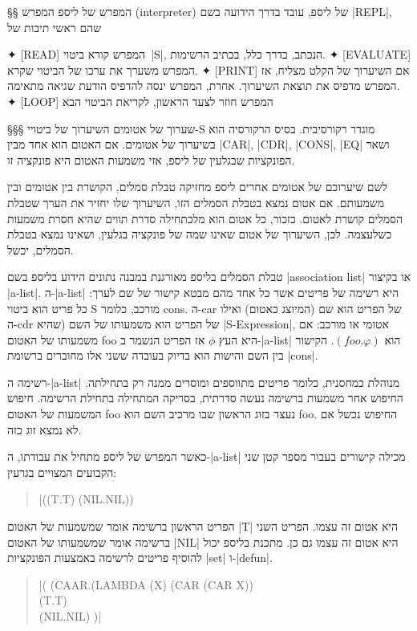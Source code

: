 §§ המפרש של ליספ
המפרש (interpreter) של ליספ, עובד בדרך הידועה בשם \E|REPL|, שהם ראשי תיבות של
\begin{description}
  ✦ [READ] המפרש קורא ביטוי~\E|S|, הנכתב, בדרך כלל, בכתיב הרשימות.
  ✦ [EVALUATE] המפרש משערך את ערכו של הביטוי שקרא.
  ✦ [PRINT] אם השיערוך של הקלט מצליח, אז המפרש מדפיס את תוצאת השיערוך. אחרת, 
המפרש ינסה להדפיס הודעת שגיאה מתאימה.
  ✦ [LOOP] המפרש חוזר לצעד הראשון, לקריאת הביטוי הבא
\end{description}

§§§ שערוך של אטומים 
השיערוך של ביטויי-S מוגדר רקורסיבית.  בסיס הרקורסיה הוא בשיערוך של אטומים. אם 
האטום הוא אחד מבין
\A|CAR|, \A|CDR|, \A|CONS|, \A|EQ| ושאר
הפונקציות שבגלעין של ליספ, אזי משמעות האטום
היא פונקציה זו. 

לשם שיערוכם של אטומים אחרים ליספ מחזיקה טבלת סמלים, הקושרת בין אטומים ובין
משמעותם.  אם אטום נמצא בטבלת הסמלים הזו, השיערוך שלו יחזיר את הערך שטבלת הסמלים
קושרת לאטום.  כזכור, כל אטום הוא מלכתחילה סדרת תווים שהיא חסרת משמעות כשלעצמה.
לכן, השיערוך של אטום שאינו שמה של פונקציה בגלעין, ושאינו נמצא בטבלת הסמלים,
יכשל.

טבלת הסמלים בליספ מאורגנת במבנה נתונים הידוע בליספ בשם \E|association list| או
בקיצור \E|a-list|.  ה-\E|a-list| היא רשימה של פריטים אשר כל אחד מהם מבטא קישור
של שם לערך: כל פריט הוא ביטוי S מורכב, כלומר cons. ה-car של הפריט הוא שם
(המיוצג כאטום) ואילו ה-cdr של הפריט הוא משמעותו של השם (שהיא \E|S-Expression|,
אטומי או מורכב: אם משמעותו של האטום foo היא העץ $ϕ$ אז הפריט הנשמר ב-\E|a-list|
הוא $(foo.φ)$.  הקישור בין השם והישות הוא בדיוק בעובדה ששני אלו מחוברים ברשומת
\E|cons|.

רשימה ה-\E|a-list| מנוהלת כמחסנית, כלומר פריטים מתווספים ומוסרים ממנה  רק
בתחילתה. החיפוש אחר משמעות ברשימה נעשה סדרתית, בסריקה המתחילה בתחילת הרשימה.
חיפוש המשמעות של האטום foo נעצר
בזוג הראשון שבו מרכיב השם הוא foo. החיפוש נכשל אם לא נמצא זוג כזה.  

כאשר המפרש של ליספ מתחיל את עבודתו, ה-\E|a-list| מכילה קישורים בעבור מספר קטן
שני הקבועים המצויים בגרעין:  
\begin{english}
  \begin{quote}
    \A|((T.T) (NIL.NIL))
  \end{quote}
\end{english}
הפריט הראשון ברשימה אומר שמשמעות של האטום \A|T| היא אטום זה עצמו.  הפריט השני
ברשימה אומר שמשמעותו של האטום \A|NIL| היא אטום זה עצמו גם כן.
מתכנת בליספ יכול להוסיף פריטים לרשימה באמצעות הפונקציות \E|set|
ו-\E|defun|. 


\begin{english}
  \begin{quote}
    \A|(
      (CAAR.(LAMBDA (X) (CAR (CAR X))  \\
      (T.T)  \\
      (NIL.NIL)
    )|
  \end{quote}
\end{english}

